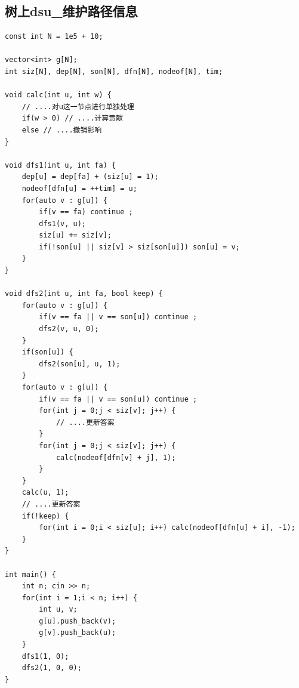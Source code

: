 \documentclass[twoside]{article}
\begin{document}
\subsection{树上dsu_维护路径信息}
\begin{lstlisting}
const int N = 1e5 + 10;

vector<int> g[N];
int siz[N], dep[N], son[N], dfn[N], nodeof[N], tim;

void calc(int u, int w) {
    // ....对u这一节点进行单独处理
    if(w > 0) // ....计算贡献
    else // ....撤销影响
}

void dfs1(int u, int fa) {
    dep[u] = dep[fa] + (siz[u] = 1);
    nodeof[dfn[u] = ++tim] = u;
    for(auto v : g[u]) {
        if(v == fa) continue ;
        dfs1(v, u);
        siz[u] += siz[v];
        if(!son[u] || siz[v] > siz[son[u]]) son[u] = v;
    }
}

void dfs2(int u, int fa, bool keep) {
    for(auto v : g[u]) {
        if(v == fa || v == son[u]) continue ;
        dfs2(v, u, 0);
    }
    if(son[u]) {
        dfs2(son[u], u, 1);
    }
    for(auto v : g[u]) {
        if(v == fa || v == son[u]) continue ;
        for(int j = 0;j < siz[v]; j++) {
            // ....更新答案
        }
        for(int j = 0;j < siz[v]; j++) {
            calc(nodeof[dfn[v] + j], 1);
        }
    }
    calc(u, 1);
    // ....更新答案
    if(!keep) {
        for(int i = 0;i < siz[u]; i++) calc(nodeof[dfn[u] + i], -1);
    }
}

int main() {
    int n; cin >> n;
    for(int i = 1;i < n; i++) {
        int u, v;
        g[u].push_back(v);
        g[v].push_back(u);
    }
    dfs1(1, 0);
    dfs2(1, 0, 0);
}\end{lstlisting}
\end{document}
